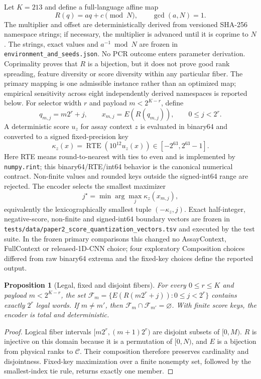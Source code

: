 \documentclass[10pt]{article}
\newtheorem{proposition}{Proposition}
\begin{document}
Let $K=213$ and define a full-language affine map
\[
 R(q)=aq+c\pmod N,\qquad \gcd(a,N)=1.
\]
The multiplier and offset are deterministically derived from versioned SHA-256 namespace strings; if necessary, the multiplier is advanced until it is coprime to $N$. The strings, exact values and $a^{-1}\bmod N$ are frozen in \texttt{environment\_and\_seeds.json}. No PCR outcome enters parameter derivation. Coprimality proves that $R$ is a bijection, but it does not prove good rank spreading, feature diversity or score diversity within any particular fiber. The primary mapping is one admissible instance rather than an optimized map; empirical sensitivity across eight independently derived namespaces is reported below. For selector width $r$ and payload $m<2^{K-r}$, define
\[
 q_{m,j}=m2^r+j,\qquad x_{m,j}=E(R(q_{m,j})),\qquad 0\leq j<2^r.
\]
A deterministic score $u_z$ for assay context $z$ is evaluated in binary64 and converted to a signed fixed-precision key
\[
 \kappa_z(x)=\operatorname{RTE}\!\left(10^{12}u_z(x)\right)
 \in[-2^{63},2^{63}-1].
\]
Here RTE means round-to-nearest with ties to even and is implemented by \texttt{numpy.rint}; this binary64/RTE/int64 behavior is the canonical numerical contract. Non-finite values and rounded keys outside the signed-int64 range are rejected. The encoder selects the smallest maximizer
\[
 j^\star=\min\arg\max_j \kappa_z(x_{m,j}),
\]
equivalently the lexicographically smallest tuple $(-\kappa_z,j)$. Exact half-integer, negative-score, non-finite and signed-int64 boundary vectors are frozen in \texttt{tests/data/paper2\_score\_quantization\_vectors.tsv} and executed by the test suite. In the frozen primary comparisons this changed no AssayContext, FullContext or released-1D-CNN choice; four exploratory Composition choices differed from raw binary64 extrema and the fixed-key choices define the reported output.

\begin{proposition}[Legal, fixed and disjoint fibers]
For every $0\leq r\leq K$ and payload $m<2^{K-r}$, the set $\mathcal F_m=\{E(R(m2^r+j)):0\leq j<2^r\}$ contains exactly $2^r$ legal words. If $m\neq m'$, then $\mathcal F_m\cap\mathcal F_{m'}=\varnothing$. With finite score keys, the encoder is total and deterministic.
\end{proposition}

\begin{proof}
Logical fiber intervals $[m2^r,(m+1)2^r)$ are disjoint subsets of $[0,M)$. $R$ is injective on this domain because it is a permutation of $[0,N)$, and $E$ is a bijection from physical ranks to $\mathcal C$. Their composition therefore preserves cardinality and disjointness. Fixed-key maximization over a finite nonempty set, followed by the smallest-index tie rule, returns exactly one member.
\end{proof}
\end{document}
